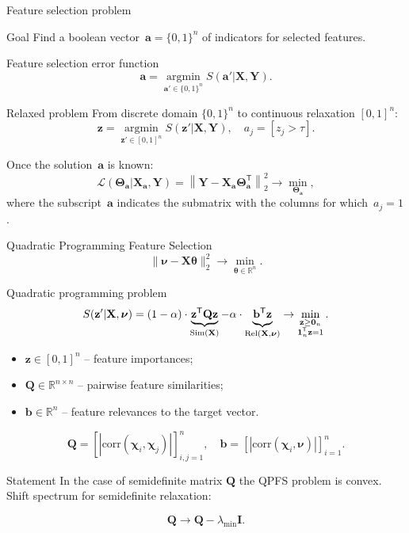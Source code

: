 \documentclass[9pt]{beamer}
\newcommand{\bz}{\mathbf{z}}
\newcommand{\ba}{\mathbf{a}}
\newcommand{\bb}{\mathbf{b}}
\newcommand{\bY}{\mathbf{Y}}
\newcommand{\bX}{\mathbf{X}}
\newcommand{\bQ}{\mathbf{Q}}
\newcommand{\bbR}{\mathbb{R}}
\newcommand{\bchi}{\boldsymbol{\chi}}
\newcommand{\bnu}{\boldsymbol{\nu}}
\newcommand{\bOne}{\boldsymbol{1}}
\newcommand{\bZero}{\boldsymbol{0}}
\newcommand{\btheta}{\boldsymbol{\theta}}
\newcommand{\bTheta}{\boldsymbol{\Theta}}
\newcommand{\argmin}{\mathop{\arg \min}\limits}
\newcommand{\T}{\mathsf{T}}
\begin{document}
\begin{frame}{Feature selection problem}
\begin{block}{Goal}
Find a boolean vector~$\ba = \{0, 1\}^n$ of indicators for selected features. 
\end{block}
\begin{block}{Feature selection error function}
	\vspace{-0.2cm}
\[
\ba = \argmin_{\ba' \in \{0, 1\}^n} S(\ba' | \bX, \bY).
\]
\vspace{-0.5cm}
\end{block}
\begin{block}{Relaxed problem}
	From discrete domain $\{0, 1\}^n$ to continuous relaxation $[0, 1]^n$:
	\[
	\bz = \argmin_{\bz' \in [0, 1]^n} S(\bz' | \bX, \bY), \quad 
	a_j = [z_j > \tau].
\]
\end{block}
Once the solution~$\ba$ is known:
\[
\mathcal{L}(\bTheta_{\ba} | \bX_{\ba}, \bY) = {\left\| \mathbf{Y} - \bX_{\ba}\bTheta^{\T}_{\ba} \right\| }_2^2 \rightarrow\min_{\bTheta_{\ba}},
\]
where the subscript~$\ba$ indicates the submatrix with the columns for which~$a_j = 1$.
\end{frame}
\begin{frame}{Quadratic Programming Feature Selection}
	\[
	\| \bnu - \bX \btheta\|_2^2 \rightarrow\min_{\btheta \in \bbR^{n}}.
	\]
	\vspace{-0.3cm}
	\begin{block}{Quadratic programming problem}
	\vspace{-0.3cm}
	\[
	S(\bz' | \bX, \bnu)	= (1 - \alpha) \cdot \underbrace{\bz^{\T} \bQ \bz}_{\text{Sim}(\bX)} - \alpha \cdot \underbrace{\vphantom{()} \mathbf{b}^{\T} \bz}_{\text{Rel}(\bX, \bnu)} \rightarrow \min_{\substack{\bz \geq \bZero_n \\ \bOne_n^{\T} \bz=1}}.
	\]
	\end{block}
		\begin{itemize}
			\item $\bz \in [0, 1]^n$ -- feature importances;
			\item $\bQ \in \bbR^{n \times n}$ -- pairwise feature similarities;
			\item $\mathbf{b} \in \bbR^n$ -- feature relevances to the target vector.
		\end{itemize}
		\[
		\bQ = \left[\left|\text{corr}(\bchi_i, \bchi_j)\right|\right]_{i,j=1}^n, \quad
		\bb = \left[\left|\text{corr}(\bchi_i, \bnu)\right|\right]_{i=1}^n.
		\]
\vspace{-0.2cm}
\begin{block}{Statement}
	In the case of semidefinite matrix $\bQ$ the QPFS problem is convex. Shift spectrum for semidefinite relaxation:
\end{block}
\begin{equation*}
\bQ \rightarrow \bQ - \lambda_{\min} \mathbf{I}.
\end{equation*}
\end{frame}
\end{document}

